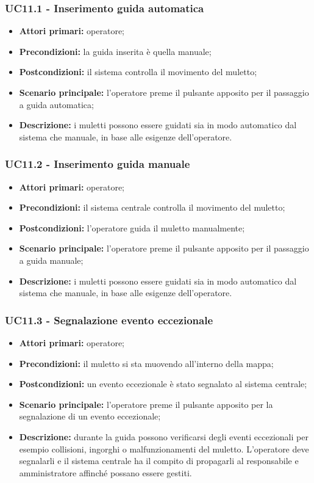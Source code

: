 \subsubsection{UC11.1 - Inserimento guida automatica}
\begin{itemize}
	\item 	\textbf{Attori primari:} operatore;
	\item 	\textbf{Precondizioni:} la guida inserita è quella manuale;
	\item 	\textbf{Postcondizioni:} il sistema controlla il movimento del muletto;
	\item 	\textbf{Scenario principale:} l'operatore preme il pulsante apposito per il passaggio a guida automatica;
	\item 	\textbf{Descrizione:} i muletti possono essere guidati sia in modo automatico dal sistema che manuale, in base alle esigenze dell'operatore.
\end{itemize}

\subsubsection{UC11.2 - Inserimento guida manuale}
\begin{itemize}
	\item 	\textbf{Attori primari:} operatore;
	\item 	\textbf{Precondizioni:} il sistema centrale controlla il movimento del muletto;
	\item 	\textbf{Postcondizioni:} l'operatore guida il muletto manualmente; 
	\item 	\textbf{Scenario principale:} l'operatore preme il pulsante apposito per il passaggio a guida manuale;
	\item 	\textbf{Descrizione:} i muletti possono essere guidati sia in modo automatico dal sistema che manuale, in base alle esigenze dell'operatore.
\end{itemize}

\subsubsection{UC11.3 - Segnalazione evento eccezionale}
\begin{itemize}
	\item 	\textbf{Attori primari:} operatore;
	\item 	\textbf{Precondizioni:} il muletto si sta muovendo all'interno della mappa;
	\item 	\textbf{Postcondizioni:} un evento eccezionale è stato segnalato al sistema centrale; 
	\item 	\textbf{Scenario principale:} l'operatore preme il pulsante apposito per la segnalazione di un evento eccezionale;
	\item 	\textbf{Descrizione:} durante la guida possono verificarsi degli eventi eccezionali per esempio collisioni, ingorghi o malfunzionamenti del muletto. L'operatore deve segnalarli e il sistema centrale ha il compito di propagarli al responsabile e amministratore affinché possano essere gestiti.

\end{itemize}

